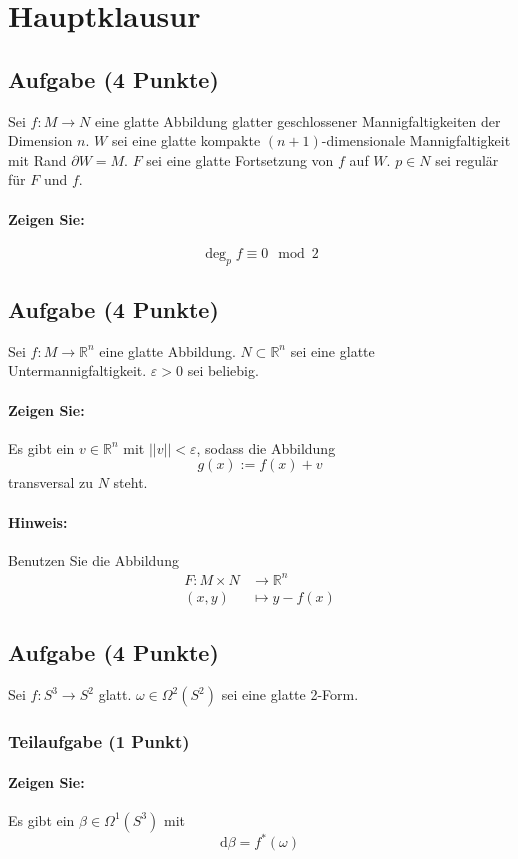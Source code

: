 \documentclass[12pt]{article}
\newcommand{\bet}[1]{\left|#1\right|}
\newcommand{\norm}[1]{\bet{\bet{#1}}}
\newcommand{\R}{\mathbb{R}}
\newcommand{\Pfeil}[1]{\overset{#1}{\longrightarrow}}
\newcommand{\pfeil}[1]{\overset{#1}{\rightarrow}}
\renewcommand{\d}{\text{d}}
\renewcommand{\epsilon}{\varepsilon}
\begin{document}
\section{Hauptklausur}
\subsection{Aufgabe (4 Punkte)}
Sei $f :M \pfeil{} N$ eine glatte Abbildung glatter geschlossener Mannigfaltigkeiten der Dimension $n$. $W$ sei eine glatte kompakte $(n+1)$-dimensionale Mannigfaltigkeit mit Rand $\partial W = M$. $F$ sei eine glatte Fortsetzung von $f$ auf $W$. $p \in N$ sei regulär für $F$ und $f$.
\paragraph{Zeigen Sie:}
\[ \deg_p f \equiv 0 \mod 2 \]

\subsection{Aufgabe (4 Punkte)}
Sei $f :M \pfeil{} \R^n$ eine glatte Abbildung. $N\subset \R^n$ sei eine glatte Untermannigfaltigkeit. $\epsilon > 0$ sei beliebig.
\paragraph{Zeigen Sie:} Es gibt ein $v \in \R^n$ mit $\norm{v} < \epsilon$, sodass die Abbildung
\[ g(x) := f(x) + v \]
transversal zu $N$ steht.
\paragraph{Hinweis:} Benutzen Sie die Abbildung
\begin{align*}
F: M\times N &\Pfeil{} \R^n\\
(x,y) & \longmapsto y - f(x)
\end{align*}

\subsection{Aufgabe (4 Punkte)}
Sei $f : S^3 \pfeil{} S^2$ glatt. $\omega \in \Omega^2(S^2)$ sei eine glatte 2-Form.
\subsubsection{Teilaufgabe (1 Punkt)}
\paragraph{Zeigen Sie:} Es gibt ein $\beta \in \Omega^1(S^3)$ mit
\[ \d \beta = f^*(\omega) \]
\end{document}
